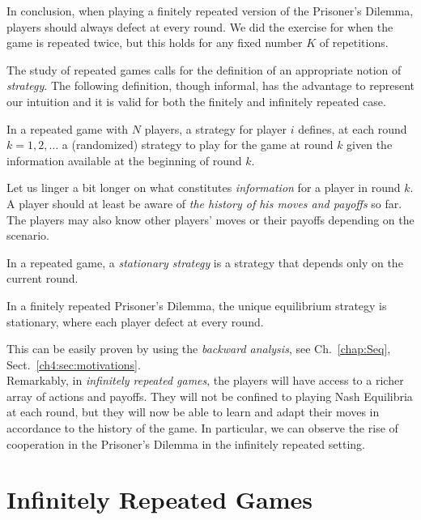 \begin{example}
In conclusion, when playing a finitely repeated version of the Prisoner's
Dilemma, players should always defect at every round.
We did the exercise for when the game is repeated twice, but this holds
for any fixed number $K$ of repetitions.
\end{example}

The study of repeated games calls for the definition of an appropriate
notion of \emph{strategy}. The following definition, though informal, has the advantage to represent our intuition and it is valid for both the finitely and infinitely repeated case.

\begin{definition}
In a repeated game with $N$ players, a strategy for player $i$ defines,
at each round $k = 1, 2, \ldots$ a (randomized) strategy to play for the
game at round $k$ given the information available at the beginning of
round $k$.
\end{definition}

Let us linger a bit longer on what constitutes \emph{information} for a
player in round $k$. A player should at least be aware of
\emph{the history of his moves and payoffs} so far.
The players may also know other players' moves or their payoffs depending
on the scenario.

\begin{definition}
In a repeated game, a \emph{stationary strategy} is a strategy that
depends only on the current round.
\end{definition}

\begin{proposition}
In a finitely repeated Prisoner's Dilemma, the unique equilibrium
strategy is stationary, where each player defect at every round.
\end{proposition}
This can be easily proven by using the \emph{backward analysis}, see Ch.\ \ref{chap:Seq}, Sect.\ \ref{ch4:sec:motivations}.\\
Remarkably, in \emph{infinitely repeated games}, the players will have
access to a richer array of actions and payoffs. They will not be
confined to playing Nash Equilibria at each round, but they will now be
able to learn and adapt their moves in accordance to the history of the
game. In particular, we can observe the rise of cooperation in the
Prisoner's Dilemma in the infinitely repeated setting.

\section{Infinitely Repeated Games}
\label{sec:InfRep}

